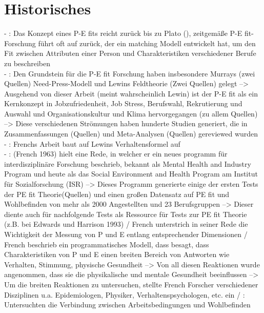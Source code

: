\section{Historisches}
\label{ch:personEnvironmentFit:historisches}
- \cite[S. 2]{edwards:2008}: Das Konzept eines P-E fits reicht zurück bis zu Plato (\cite{dumont:1995}), zeitgemäße P-E fit-Forschung führt oft auf \textcite{parsons:1909} zurück, der ein matching Modell entwickelt hat, um den Fit zwischen Attributen einer Person und Charakteristiken verschiedener Berufe zu beschreiben \\
- \cite[S. 2]{edwards:2008}: Den Grundstein für die P-E fit Forschung haben insbesondere Murrays (zwei Quellen) Need-Press-Modell und Lewins Feldtheorie (Zwei Quellen) gelegt --> Ausgehend von dieser Arbeit (meint wahrscheinlich Lewin) ist der P-E fit als ein Kernkonzept in Jobzufriedenheit, Job Stress, Berufswahl, Rekrutierung und Auswahl und Organisationskultur und Klima hervorgegangen (zu allem Quellen) --> Diese verschiedenen Strömungen haben hunderte Studien generiert, die in Zusammenfassungen (Quellen) und Meta-Analysen (Quellen) gereviewed wurden \\
- \cite[S. 1f.]{caplan:1993}: Frenchs Arbeit baut auf Lewins Verhaltensformel auf \\
- \cite[S. 1f.]{caplan:1993}: (French 1963) hielt eine Rede, in welcher er ein neues programm für interdisziplinäre Forschung beschrieb, bekannt als Mental Health and Industry Program und heute als das Social Environment and Health Program am Institut für Sozialforschung (ISR) --> Dieses Programm generierte einige der ersten Tests der PE fit Theorie(Quellen) und einen großen Datensatz auf PE fit und Wohlbefinden von mehr als 2000 Angestellten und 23 Berufsgruppen --> Dieser diente auch für nachfolgende Tests als Ressource für Tests zur PE fit Theorie (z.B. bei Edwards und Harrison 1993) / French unterstrich in seiner Rede die Wichtigkeit der Messung von P und E entlang entsprechender Dimensionen / French beschrieb ein programmatisches Modell, dass besagt, dass Charakteristiken von P und E einen breiten Bereich von Antworten wie Verhalten, Stimmung, physische Gesundheit --> Von all diesen Reaktionen wurde angenommen, dass sie die physikalische und mentale Gesundheit beeinflussen --> Um die breiten Reaktionen zu untersuchen, stellte French Forscher verschiedener Disziplinen u.a. Epidemiologen, Physiker, Verhaltenspsychologen, etc. ein / \cite[S. 4]{caplan:1993}: Untersuchten die Verbindung zwischen Arbeitsbedingungen und Wohlbefinden\\
